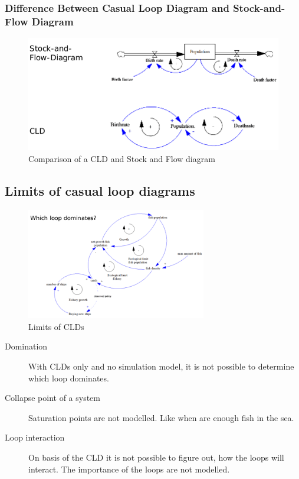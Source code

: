 \subsubsection{Difference Between Casual Loop Diagram and Stock-and-Flow Diagram}

\begin{figure}[H]
	\centering
	\includegraphics[width=.6\textwidth]{figures/cldVsStockFlow.png}
	\caption{Comparison of a CLD and Stock and Flow diagram}
\end{figure}

\subsection{Limits of casual loop diagrams}

\begin{figure}[H]
	\centering
	\includegraphics[width=0.7\textwidth]{figures/limitsCld.png}
	\caption{Limits of CLDs}
\end{figure}

\begin{description}
	\item[Domination] With CLDs only and no simulation model, it is not possible
	to determine which loop dominates.
	\item[Collapse point of a system] Saturation points are not modelled. Like
	when are enough fish in the	sea.
	\item[Loop interaction] On basis of the CLD it is not possible to figure
	out, how the loops will interact. The importance of the loops are not
	modelled.
\end{description}

